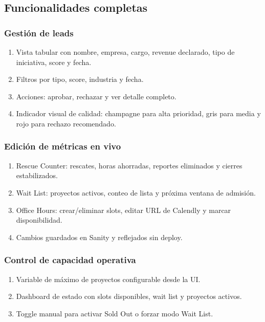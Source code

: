 \documentclass[11pt,letterpaper]{article}
\begin{document}
\subsection{Funcionalidades completas}

\subsubsection{Gestión de leads}

\begin{enumerate}
\item Vista tabular con nombre, empresa, cargo, revenue declarado, tipo de iniciativa, score y fecha.
\item Filtros por tipo, score, industria y fecha.
\item Acciones: aprobar, rechazar y ver detalle completo.
\item Indicador visual de calidad: champagne para alta prioridad, gris para media y rojo para rechazo recomendado.
\end{enumerate}

\subsubsection{Edición de métricas en vivo}

\begin{enumerate}
\item Rescue Counter: rescates, horas ahorradas, reportes eliminados y cierres estabilizados.
\item Wait List: proyectos activos, conteo de lista y próxima ventana de admisión.
\item Office Hours: crear/eliminar slots, editar URL de Calendly y marcar disponibilidad.
\item Cambios guardados en Sanity y reflejados sin deploy.
\end{enumerate}

\subsubsection{Control de capacidad operativa}

\begin{enumerate}
\item Variable de máximo de proyectos configurable desde la UI.
\item Dashboard de estado con slots disponibles, wait list y proyectos activos.
\item Toggle manual para activar Sold Out o forzar modo Wait List.
\end{enumerate}
\end{document}
